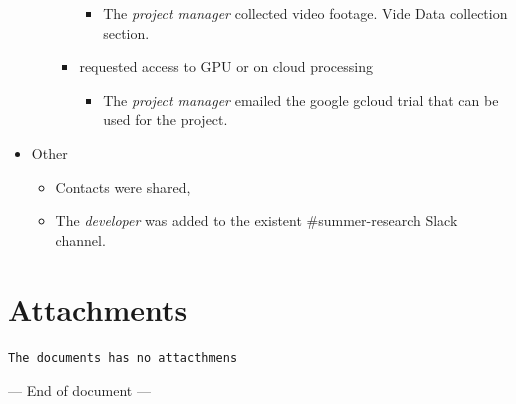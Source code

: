 \documentclass{article}
\begin{document}
\begin{itemize}
\begin{itemize}
\begin{itemize}
\begin{itemize}
\item The \emph{project manager} collected video footage. Vide Data collection section.
\end{itemize}
\item requested access to GPU or on cloud processing
\begin{itemize}
\item The \emph{project manager} emailed the google gcloud trial that can be used for the project.
\end{itemize}
\end{itemize}
\end{itemize}
\item Other
\begin{itemize}
\item Contacts were shared,

\item The \emph{developer} was added to the existent \#summer-research Slack channel.
\end{itemize}
\end{itemize}


\section{Attachments}
\label{sec:orgbae8865}
\texttt{The documents has no attacthmens}

\begin{center}
--- End of document ---
\end{center}
\end{document}
